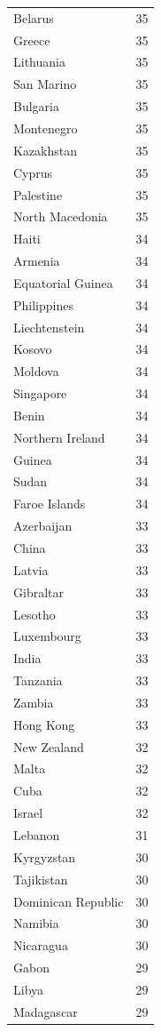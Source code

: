 \begin{tabular}{ll}
Belarus & 35 \\
Greece & 35 \\
Lithuania & 35 \\
San Marino & 35 \\
Bulgaria & 35 \\
Montenegro & 35 \\
Kazakhstan & 35 \\
Cyprus & 35 \\
Palestine & 35 \\
North Macedonia & 35 \\
Haiti & 34 \\
Armenia & 34 \\
Equatorial Guinea & 34 \\
Philippines & 34 \\
Liechtenstein & 34 \\
Kosovo & 34 \\
Moldova & 34 \\
Singapore & 34 \\
Benin & 34 \\
Northern Ireland & 34 \\
Guinea & 34 \\
Sudan & 34 \\
Faroe Islands & 34 \\
Azerbaijan & 33 \\
China & 33 \\
Latvia & 33 \\
Gibraltar & 33 \\
Lesotho & 33 \\
Luxembourg & 33 \\
India & 33 \\
Tanzania & 33 \\
Zambia & 33 \\
Hong Kong & 33 \\
New Zealand & 32 \\
Malta & 32 \\
Cuba & 32 \\
Israel & 32 \\
Lebanon & 31 \\
Kyrgyzstan & 30 \\
Tajikistan & 30 \\
Dominican Republic & 30 \\
Namibia & 30 \\
Nicaragua & 30 \\
Gabon & 29 \\
Libya & 29 \\
Madagascar & 29 \\

\end{tabular}
